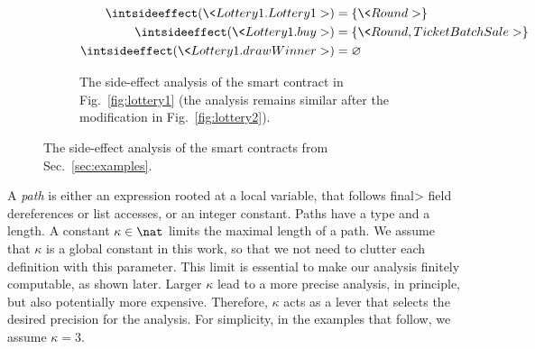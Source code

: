 \begin{example}
\begin{figure}[t]
\begin{center}
\begin{subfigure}{\textwidth}
\begin{align*}
        \intsideeffect(\<Lottery1.Lottery1>)&=\{\<Round>\}\\
        \intsideeffect(\<Lottery1.buy>)&=\{\<Round,TicketBatchSale>\}\\
        \intsideeffect(\<Lottery1.drawWinner>)&=\varnothing
      \end{align*}
      \caption{The side-effect analysis of the smart contract in Fig.~\ref{fig:lottery1}
      (the analysis remains similar after the modification in Fig.~\ref{fig:lottery2}).}
    \end{subfigure}
    \end{center}
    \caption{The side-effect analysis of the smart contracts from Sec.~\ref{sec:examples}.}
    \label{fig:side_effect_examples}
  \end{figure}
\end{example}

A \emph{path} is either an expression rooted at a local variable, that follows
\<final> field dereferences or list accesses, or an integer constant.
Paths have a type and a length. A constant $\kappa\in\nat$ limits the maximal
length of a path. We assume that $\kappa$ is a global constant in this work,
so that we not need to clutter each definition with this parameter.
This limit is essential to make our analysis finitely computable, as shown later.
Larger $\kappa$ lead to a more precise analysis,
in principle, but also potentially more expensive.
Therefore, $\kappa$ acts as a lever that selects the desired precision for the
analysis. For simplicity, in the examples that follow, we assume $\kappa=3$.

